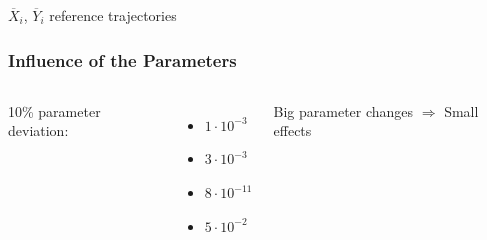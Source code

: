 \begin{frame}[c]
		$\overline{X}_i$, $\overline{Y}_i$ reference trajectories
\end{frame}

\begin{frame}[c]
	\frametitle{Influence of the Parameters}
	\begin{columns}[c]
	
			10\% parameter deviation:
			\vspace{.5cm}
			\begin{itemize}
				\item{ $1\cdot 10^{-3}$}
				\item{ $3\cdot 10^{-3}$}
				\item{ $8\cdot 10^{-11}$}
				\item{ $5\cdot 10^{-2}$}
			\end{itemize}
			\vspace{.5cm}
			Big parameter changes $\Rightarrow$ Small effects
		

\end{columns}
\end{frame}
